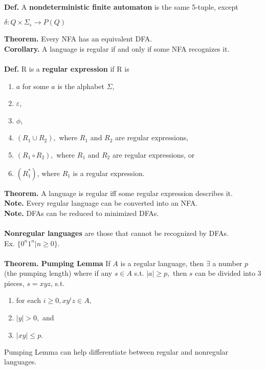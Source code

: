 \documentclass[12pt]{article}
\begin{document}
\begin{multicols}{2}
\\
\textbf{Def.} A \textbf{nondeterministic finite automaton} is the same 5-tuple, except
\begin{center}
$\delta: Q \times \Sigma_{\epsilon} \rightarrow P(Q)$
\end{center}
\textbf{Theorem.} Every NFA has an equivalent DFA.\\
\textbf{Corollary.} A language is regular if and only if some NFA recognizes it.\\
\\
\textbf{Def.} R is a \textbf{regular expression} if R is
\begin{enumerate}
\itemsep-0.5em
\item $a$ for some $a$ is the alphabet $\Sigma$,
\item $\varepsilon$,
\item $\phi$,
\item $(R_{1} \cup R_{2}),$ where $R_{1}$ and $R_{2}$ are regular expressions,
\item $(R_{1} \circ R_{2}),$ where $R_{1}$ and $R_{2}$ are regular expressions, or
\item $(R_{1}^{*})$, where $R_{1}$ is a regular expression.
\end{enumerate}
\textbf{Theorem.} A language is regular iff some regular expression describes it.\\
\textbf{Note.} Every regular language can be converted into an NFA.\\
\textbf{Note.} DFAs can be reduced to minimized DFAs.\\
\\
\textbf{Nonregular languages} are those that cannot be recognized by DFAs.\\
Ex. $\lbrace 0^{n}1^{n} | n \geq 0 \rbrace.$\\\\
\textbf{Theorem. Pumping Lemma} If $A$ is a regular language, then $\exists$ a number $p$ (the pumping length) where if any $s \in A$ s.t. $|a| \geq p,$ then $s$ can be divided into 3 pieces, $s=xyz$, s.t.
\begin{enumerate}
\itemsep-0.5em
\item for each $i \geq 0, xy^{i}z \in A,$
\item $|y| > 0,$ and
\item $|xy| \leq p.$
\end{enumerate}
Pumping Lemma can help differentiate between regular and nonregular languages.\\\\

\end{multicols}
\end{document}
